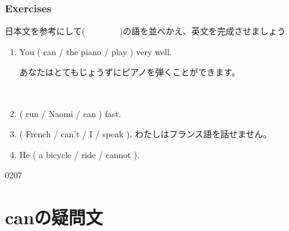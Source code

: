 \documentclass[aspectratio=169,xcolor={dvipsnames,table}]{beamer}
\newcommand{\myaudio}[1]{\href{#1}{\faVolumeUp}}
\begin{document}
\begin{frame}[plain]\frametitle{Exercises}

日本文を参考にして(~~~~~~~~)の語を並べかえ、英文を完成させましょう

\begin{enumerate}

 \item You ( can / the piano / play ) very well.
\hspace{2\zw}\begin{minipage}[t]{15\zw}{\scriptsize あなたはとてもじょうずにピアノを弾くことができます。}\end{minipage}
\\
 \item  ( run / Naomi / can ) fast.\hspace{8.75\zw}{\scriptsize ナオミは速く走ることができます。}\\
 \item ( French / can't / I / speak ).\hspace{7.5\zw}%
{\scriptsize わたしはフランス語を話せません。}\\
 \item He ( a bicycle / ride / cannot ).\hspace{6.2\zw}{\scriptsize 彼は自転車に乗れません。}\\
\end{enumerate}

\hfill{\tiny 0207}\,{\scriptsize \myaudio{./audio/012_can_06.mp3}}
\end{frame}
\section{canの疑問文}
\end{document}
